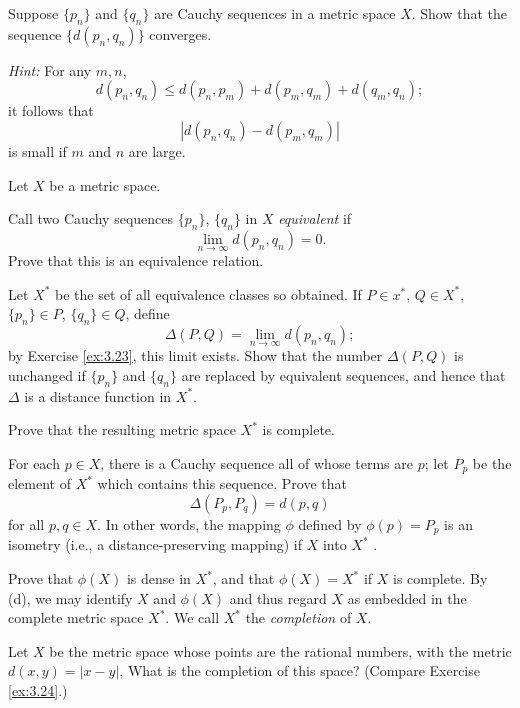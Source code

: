 \begin{myexercise}
    \label{ex:3.23}
    Suppose $\{p_n\}$ and $\{q_n\}$ are Cauchy sequences in a metric space $X$. 
    Show that the sequence $\{d(p_n, q_n)\}$ converges. 
    
    \emph{Hint:} For any $m, n$,
    \begin{equation*}
        d(p_n, q_n) \leq d(p_n, p_m) + d(p_m, q_m) + d(q_m , q_n);
    \end{equation*}
    it follows that 
    \begin{equation*}
        \left| d(p_n, q_n) - d(p_m, q_m) \right| 
    \end{equation*}
    is small if $m$ and $n$ are large.
\end{myexercise}


\begin{myexercise}
    \label{ex:3.24}
    Let $X$ be a metric space.
    \begin{asparaenum}[(a)]
        \item Call two Cauchy sequences $\{p_n\}$, $\{q_n\}$ in $X$ \emph{equivalent} if
        \begin{equation*}
            \lim_{n \to \infty}  d(p_n, q_n) = 0.
        \end{equation*}
        Prove that this is an equivalence relation.
        \item Let $X^*$ be the set of all equivalence classes so obtained. If $P \in x^*$, $Q \in X^*$, $\{p_n\} \in P$, $\{q_n\} \in Q$, define
        \begin{equation*}
            \Delta(P, Q) = \lim_{n \to \infty} d (p_n, q_n) ;
        \end{equation*}
        by Exercise \ref{ex:3.23}, this limit exists. Show that the number $\Delta(P, Q)$ is unchanged if $\{p_n\}$ and $\{q_n\}$ are replaced by equivalent sequences, and hence that $\Delta$ is a distance
        function in $X^*$.
        \item Prove that the resulting metric space $X^*$ is complete.
        \item For each $p \in X$, there is a Cauchy sequence all of whose terms are $p$; let $P_p$ be the element of $X^*$ which contains this sequence. Prove that
        \begin{equation*}
            \Delta(P_p, P_q) = d(p, q)
        \end{equation*}
        for all $p, q \in X$. 
        In other words, the mapping $\phi$ defined by $\phi(p) = P_p$ is an isometry (i.e., a distance-preserving mapping) if $X$ into $X^*$ .
        \item Prove that $\phi(X)$ is dense in $X^*$, and that $\phi(X) = X^*$ if $X$ is complete. By (d), we may identify $X$ and $\phi(X)$ and thus regard $X$ as embedded in the complete metric space $X^*$. We call $X^*$ the \emph{completion} of $X$.
    \end{asparaenum}
\end{myexercise}


\begin{myexercise}
    \label{ex:3.25}
    Let $X$ be the metric space whose points are the rational numbers, with the metric $d(x, y) =|x - y|$, What is the completion of this space? (Compare Exercise \ref{ex:3.24}.)
\end{myexercise}